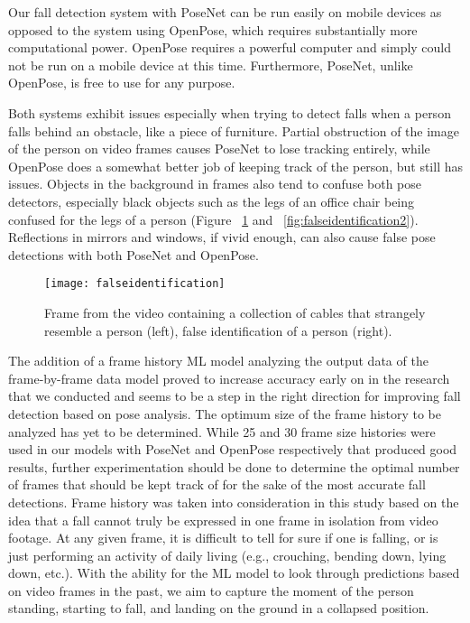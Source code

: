 Our fall detection system with PoseNet can be run easily on mobile devices as opposed to the system using OpenPose, which requires substantially more computational power. OpenPose requires a powerful computer and simply could not be run on a mobile device at this time. Furthermore, PoseNet, unlike OpenPose, is free to use for any purpose.


Both systems exhibit issues especially when trying to detect falls when a person falls behind an obstacle, like a piece of furniture. Partial obstruction of the image of the person on video frames causes PoseNet to lose tracking entirely, while OpenPose does a somewhat better job of keeping track of the person, but still has issues. Objects in the background in frames also tend to confuse both pose detectors, especially black objects such as the legs of an office chair being confused for the legs of a person (Figure ~\ref{fig:falseidentification} and ~\ref{fig:falseidentification2}). Reflections in mirrors and windows, if vivid enough, can also cause false pose detections with both PoseNet and OpenPose.



\begin{figure}
  \texttt{[image: falseidentification]}
  \caption{Frame from the video containing a collection of cables that strangely resemble a person (left), false identification of a person (right).}
  \label{fig:falseidentification}
\end{figure}




The addition of a frame history ML model analyzing the output data of the frame-by-frame data model proved to increase accuracy early on in the research that we conducted and seems to be a step in the right direction for improving fall detection based on pose analysis. The optimum size of the frame history to be analyzed has yet to be determined.  While 25 and 30 frame size histories were used in our models with PoseNet and OpenPose respectively that produced good results, further experimentation should be done to determine the optimal number of frames that should be kept track of for the sake of the most accurate fall detections. Frame history was taken into consideration in this study based on the idea that a fall cannot truly be expressed in one frame in isolation from video footage. At any given frame, it is difficult to tell for sure if one is falling, or is just performing an activity of daily living (e.g., crouching, bending down, lying down, etc.). With the ability for the ML model to look through predictions based on video frames in the past, we aim to capture the moment of the person standing, starting to fall, and landing on the ground in a collapsed position.


